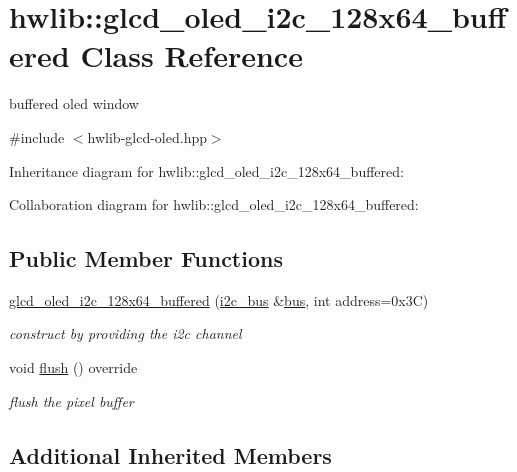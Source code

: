 \hypertarget{classhwlib_1_1glcd__oled__i2c__128x64__buffered}{}\section{hwlib\+:\+:glcd\+\_\+oled\+\_\+i2c\+\_\+128x64\+\_\+buffered Class Reference}
\label{classhwlib_1_1glcd__oled__i2c__128x64__buffered}


buffered oled window  




{\ttfamily \#include $<$hwlib-\/glcd-\/oled.\+hpp$>$}



Inheritance diagram for hwlib\+:\+:glcd\+\_\+oled\+\_\+i2c\+\_\+128x64\+\_\+buffered\+:


Collaboration diagram for hwlib\+:\+:glcd\+\_\+oled\+\_\+i2c\+\_\+128x64\+\_\+buffered\+:
\subsection*{Public Member Functions}
\begin{DoxyCompactItemize}
\item 
\mbox{\label{classhwlib_1_1glcd__oled__i2c__128x64__buffered_a416ca491f7a5e3b6aabc42928cbc6534}} 
\hyperlink{classhwlib_1_1glcd__oled__i2c__128x64__buffered_a416ca491f7a5e3b6aabc42928cbc6534}{glcd\+\_\+oled\+\_\+i2c\+\_\+128x64\+\_\+buffered} (\hyperlink{classhwlib_1_1i2c__bus}{i2c\+\_\+bus} \&\hyperlink{classhwlib_1_1ssd1306__i2c_a6dd727643c4b270cc364cd6e00ec84e9}{bus}, int address=0x3\+C)
\begin{DoxyCompactList}\small\item\em construct by providing the i2c channel \end{DoxyCompactList}\item 
void \hyperlink{classhwlib_1_1glcd__oled__i2c__128x64__buffered_aa2f62fb4a54ea1cfa9f608e703fd046e}{flush} () override
\begin{DoxyCompactList}\small\item\em flush the pixel buffer \end{DoxyCompactList}\end{DoxyCompactItemize}
\subsection*{Additional Inherited Members}


